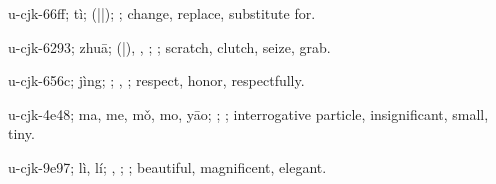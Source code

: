 \begin{multicols}{2}
{\cjkgGlue{}u-cjk-66ff; tì; \cjkgGlue{}\cjkgGlue{}(\cjkgGlue{}|\cjkgGlue{}|\cjkgGlue{}); \cjkgGlue{}; change, replace, substitute for.

\cjkgGlue{}u-cjk-6293; zhuā; \cjkgGlue{}\cjkgGlue{}(\cjkgGlue{}|\cjkgGlue{}), \cjkgGlue{}\cjkgGlue{}\cjkgGlue{}, \cjkgGlue{}\cjkgGlue{}\cjkgGlue{}; \cjkgGlue{}; scratch, clutch, seize, grab.

\cjkgGlue{}u-cjk-656c; jìng; \cjkgGlue{}\cjkgGlue{}\cjkgGlue{}; \cjkgGlue{}, \cjkgGlue{}; respect, honor, respectfully.

\cjkgGlue{}u-cjk-4e48; ma, me, mǒ, mo, yāo; \cjkgGlue{}; \cjkgGlue{}; interrogative particle, insignificant, small, tiny.

\cjkgGlue{}u-cjk-9e97; lì, lí; \cjkgGlue{}\cjkgGlue{}\cjkgGlue{}, \cjkgGlue{}\cjkgGlue{}\cjkgGlue{}; \cjkgGlue{}; beautiful, magnificent, elegant.

}
\end{multicols}
